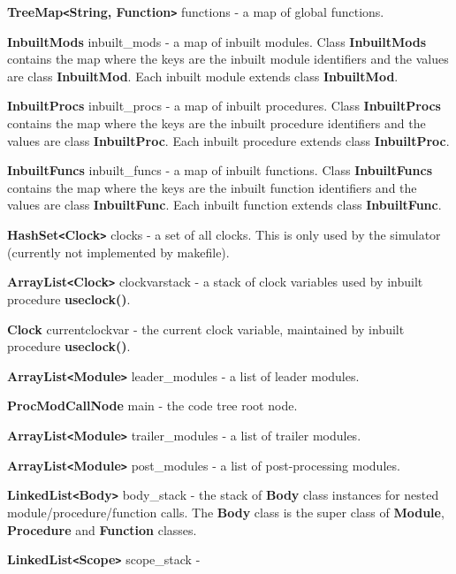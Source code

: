 \documentclass[10pt,a4paper,twoside,fleqn]{book}
\begin{document}
            {\bf TreeMap\verb'<'String, Function\verb'>'} functions -  a map of global functions.

            {\bf InbuiltMods} inbuilt\_mods -  a map
            of inbuilt modules. Class {\bf InbuiltMods} contains the map where the
            keys are the inbuilt module identifiers and the values are class
            {\bf InbuiltMod}. Each inbuilt module extends class {\bf InbuiltMod}.

            {\bf InbuiltProcs} inbuilt\_procs -  a map
            of inbuilt procedures. Class {\bf InbuiltProcs} contains the map where the
            keys are the inbuilt procedure identifiers and the values are class
            {\bf InbuiltProc}. Each inbuilt procedure extends class {\bf InbuiltProc}.

            {\bf InbuiltFuncs} inbuilt\_funcs -  a map
            of inbuilt functions. Class {\bf InbuiltFuncs} contains the map where the
            keys are the inbuilt function identifiers and the values are class
            {\bf InbuiltFunc}. Each inbuilt function extends class {\bf InbuiltFunc}.

            {\bf HashSet\verb'<'Clock\verb'>'} clocks -  a set of all clocks. This is only used by
            the simulator (currently not implemented by makefile).

            {\bf ArrayList\verb'<'Clock\verb'>'} clockvarstack -  a stack of clock variables used by inbuilt procedure {\bf useclock()}.

            {\bf Clock} currentclockvar -  the current clock variable, maintained by inbuilt procedure
            {\bf useclock()}.

            {\bf ArrayList\verb'<'Module\verb'>'} leader\_modules -  a list of leader modules.

            {\bf ProcModCallNode} main - the code tree root node.

            {\bf ArrayList\verb'<'Module\verb'>'} trailer\_modules -  a list of trailer modules.

            {\bf ArrayList\verb'<'Module\verb'>'} post\_modules -  a list of post-processing modules.

            {\bf LinkedList\verb'<'Body\verb'>'} body\_stack -  the stack
            of {\bf Body} class instances for nested module/procedure/function calls.
            The {\bf Body} class is the super class of {\bf Module}, {\bf Procedure} and
            {\bf Function} classes.

            {\bf LinkedList\verb'<'Scope\verb'>'} scope\_stack -  
\end{document}
